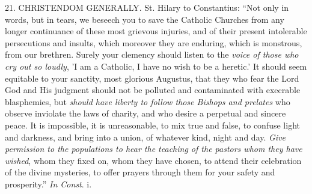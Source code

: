 21. CHRISTENDOM
GENERALLY.
St. Hilary to Constantius: ``Not only in words, but in tears, we beseech
you to save the Catholic Churches from any longer continuance of these
most grievous injuries, and of their present intolerable persecutions
and insults, which moreover they are enduring, which is monstrous, from
our brethren. Surely your clemency should listen to the \emph{voice of
those who cry out so loudly}, 'I am a Catholic, I have no wish to be
a heretic.' It should seem equitable to your sanctity, most
glorious Augustus, that they who fear the Lord God and His judgment
should not be polluted and contaminated with execrable blasphemies, but \emph{should
have liberty to follow those Bishops and prelates} who observe
inviolate the laws of charity, and who desire a perpetual and sincere
peace. It is impossible, it is unreasonable, to mix true and false, to
confuse light and darkness, and bring into a union, of whatever kind,
night and day. \emph{Give permission to the populations to hear the
teaching of the pastors whom they have wished}, whom they fixed on,
whom they have chosen, to attend their celebration of the divine
mysteries, to offer prayers through them for your safety and prosperity.''
\emph{In Const}. i.


